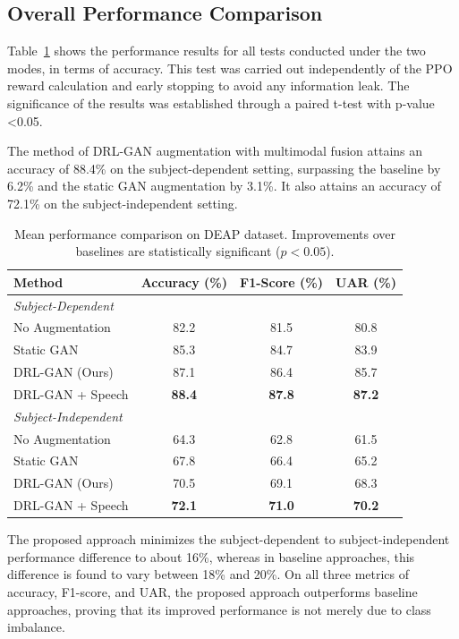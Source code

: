 \documentclass[conference]{IEEEtran}
\begin{document}
\subsection{Overall Performance Comparison}
Table~\ref{tab:results} shows the performance results for all tests conducted under the two modes, in terms of accuracy. This test was carried out independently of the PPO reward calculation and early stopping to avoid any information leak. The significance of the results was established through a paired t-test with p-value <0.05.

The method of DRL-GAN augmentation with multimodal fusion attains an accuracy of 88.4\% on the subject-dependent setting, surpassing the baseline by 6.2\% and the static GAN augmentation by 3.1\%. It also attains an accuracy of 72.1\% on the subject-independent setting.

\begin{table}[t]
\centering
\caption{Mean performance comparison on DEAP dataset. Improvements over baselines are statistically significant ($p < 0.05$).}
\label{tab:results}
\begin{tabular}{lccc}
\toprule
Method & Accuracy (\%) & F1-Score (\%) & UAR (\%) \\
\midrule
\multicolumn{4}{l}{\textit{Subject-Dependent}} \\
No Augmentation & 82.2 & 81.5 & 80.8 \\
Static GAN & 85.3 & 84.7 & 83.9 \\
DRL-GAN (Ours) & 87.1 & 86.4 & 85.7 \\
DRL-GAN + Speech & \textbf{88.4} & \textbf{87.8} & \textbf{87.2} \\
\midrule
\multicolumn{4}{l}{\textit{Subject-Independent}} \\
No Augmentation & 64.3 & 62.8 & 61.5 \\
Static GAN & 67.8 & 66.4 & 65.2 \\
DRL-GAN (Ours) & 70.5 & 69.1 & 68.3 \\
DRL-GAN + Speech & \textbf{72.1} & \textbf{71.0} & \textbf{70.2} \\
\bottomrule
\end{tabular}
\end{table}

The proposed approach minimizes the subject-dependent to subject-independent performance difference to about 16\%, whereas in baseline approaches, this difference is found to vary between 18\% and 20\%. On all three metrics of accuracy, F1-score, and UAR, the proposed approach outperforms baseline approaches, proving that its improved performance is not merely due to class imbalance.
\end{document}
